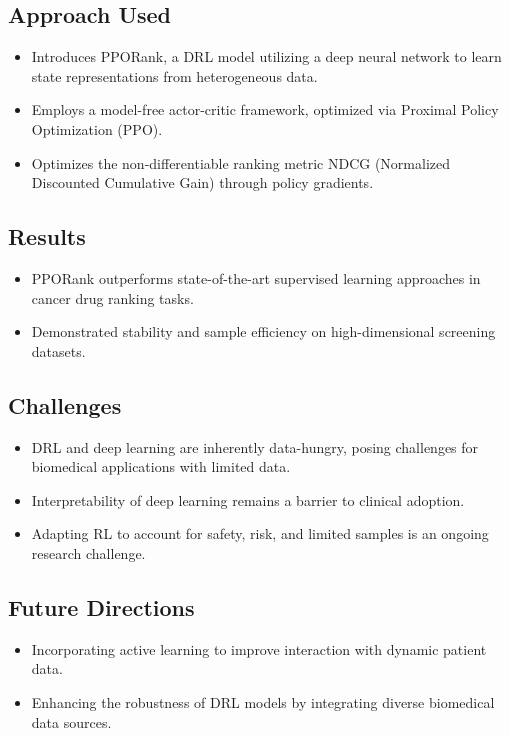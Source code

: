\subsection*{Approach Used}
\begin{itemize}
    \item Introduces PPORank, a DRL model utilizing a deep neural network to learn state representations from heterogeneous data.
    \item Employs a model-free actor-critic framework, optimized via Proximal Policy Optimization (PPO).
    \item Optimizes the non-differentiable ranking metric NDCG (Normalized Discounted Cumulative Gain) through policy gradients.
\end{itemize}

\subsection*{Results}
\begin{itemize}
    \item PPORank outperforms state-of-the-art supervised learning approaches in cancer drug ranking tasks.
    \item Demonstrated stability and sample efficiency on high-dimensional screening datasets.
\end{itemize}

\subsection*{Challenges}
\begin{itemize}
    \item DRL and deep learning are inherently data-hungry, posing challenges for biomedical applications with limited data.
    \item Interpretability of deep learning remains a barrier to clinical adoption.
    \item Adapting RL to account for safety, risk, and limited samples is an ongoing research challenge.
\end{itemize}

\subsection*{Future Directions}
\begin{itemize}
    \item Incorporating active learning to improve interaction with dynamic patient data.
    \item Enhancing the robustness of DRL models by integrating diverse biomedical data sources.
\end{itemize}

